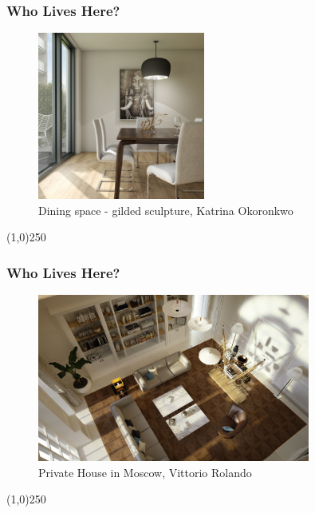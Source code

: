 \begin{frame}
\frametitle{Who Lives Here?}
\begin{figure}
	\centering
	\includegraphics[height=5.5cm]{./img/CGArchViz/Dining_table_scene_large.jpg}
	\caption{Dining space - gilded sculpture, Katrina Okoronkwo}
	\label{fig:DiningSpace}
\end{figure}
\end{frame}
\begin{center}\line(1,0){250}\end{center}



\begin{frame}
\frametitle{Who Lives Here?}
\begin{figure}
	\centering
	\includegraphics[height=5.5cm]{./img/CGArchViz/PrivateHouseMoscow.jpg}
	\caption{Private House in Moscow, Vittorio Rolando}
	\label{fig:PrivateHouse}
\end{figure}
\end{frame}
\begin{center}\line(1,0){250}\end{center}



